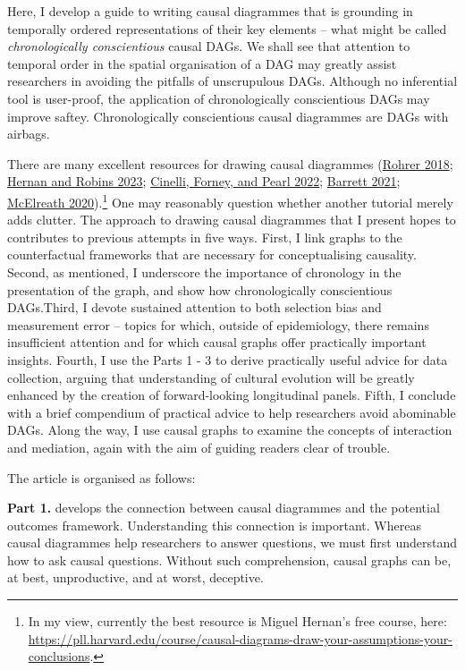 \documentclass[
  singlecolumn]{report}
\begin{document}
Here, I develop a guide to writing causal diagrammes that is grounding
in temporally ordered representations of their key elements -- what
might be called \emph{chronologically conscientious} causal DAGs. We
shall see that attention to temporal order in the spatial organisation
of a DAG may greatly assist researchers in avoiding the pitfalls of
unscrupulous DAGs. Although no inferential tool is user-proof, the
application of chronologically conscientious DAGs may improve saftey.
Chronologically conscientious causal diagrammes are DAGs with airbags.

There are many excellent resources for drawing causal diagrammes
(\protect\hyperlink{ref-rohrer2018}{Rohrer 2018};
\protect\hyperlink{ref-hernan2023}{Hernan and Robins 2023};
\protect\hyperlink{ref-cinelli2022}{Cinelli, Forney, and Pearl 2022};
\protect\hyperlink{ref-barrett2021}{Barrett 2021};
\protect\hyperlink{ref-mcelreath2020}{McElreath 2020}).\footnote{In my
  view, currently the best resource is Miguel Hernan's free course,
  here:
  \url{https://pll.harvard.edu/course/causal-diagrams-draw-your-assumptions-your-conclusions}.}
One may reasonably question whether another tutorial merely adds
clutter. The approach to drawing causal diagrammes that I present hopes
to contributes to previous attempts in five ways. First, I link graphs
to the counterfactual frameworks that are necessary for conceptualising
causality. Second, as mentioned, I underscore the importance of
chronology in the presentation of the graph, and show how
chronologically conscientious DAGs.Third, I devote sustained attention
to both selection bias and measurement error -- topics for which,
outside of epidemiology, there remains insufficient attention and for
which causal graphs offer practically important insights. Fourth, I use
the Parts 1 - 3 to derive practically useful advice for data collection,
arguing that understanding of cultural evolution will be greatly
enhanced by the creation of forward-looking longitudinal panels. Fifth,
I conclude with a brief compendium of practical advice to help
researchers avoid abominable DAGs. Along the way, I use causal graphs to
examine the concepts of interaction and mediation, again with the aim of
guiding readers clear of trouble.

The article is organised as follows:

\textbf{Part 1.} develops the connection between causal diagrammes and
the potential outcomes framework. Understanding this connection is
important. Whereas causal diagrammes help researchers to answer
questions, we must first understand how to ask causal questions. Without
such comprehension, causal graphs can be, at best, unproductive, and at
worst, deceptive.
\end{document}
